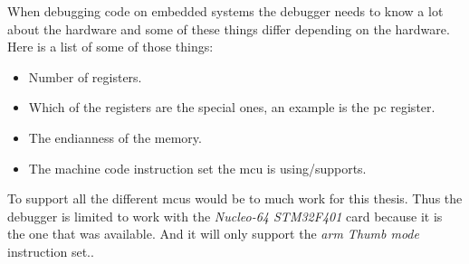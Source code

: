 When debugging code on embedded systems the debugger needs to know a lot about the hardware and some of these things differ depending on the hardware.
Here is a list of some of those things:

\begin{itemize}
  \item Number of registers.
  \item Which of the registers are the special ones, an example is the \gls{pc} register.
  \item The endianness of the memory.
  \item The machine code instruction set the \gls{mcu} is using/supports.
\end{itemize}

To support all the different \glspl{mcu} would be to much work for this thesis.
Thus the debugger is limited to work with the \emph{Nucleo-64 STM32F401} card because it is the one that was available.
And it will only support the \emph{arm Thumb mode} instruction set..






